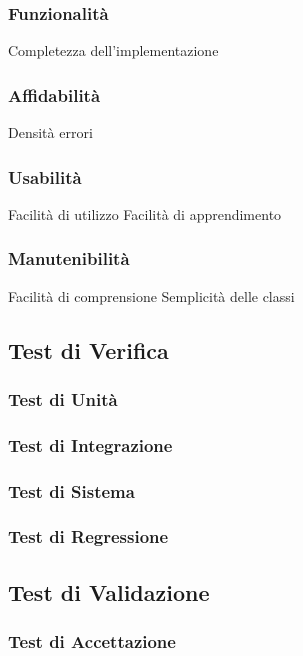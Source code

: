		\subsubsection{Funzionalità}
			Completezza dell'implementazione	%
		\subsubsection{Affidabilità}
			Densità errori	%
		\subsubsection{Usabilità}
			Facilità di utilizzo	%
			Facilità di apprendimento
		\subsubsection{Manutenibilità}
			Facilità di comprensione 	%
			Semplicità delle classi
	
	
	\subsection{Test di Verifica}
		\subsubsection{Test di Unità}
		\subsubsection{Test di Integrazione}
		\subsubsection{Test di Sistema}	
		\subsubsection{Test di Regressione}
	
	
	
	\subsection{Test di Validazione}
		\subsubsection{Test di Accettazione}	
